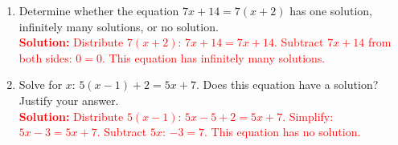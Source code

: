 \documentclass[11pt]{article}
\begin{document}
\begin{tcolorbox}[colframe=black!60, colback=white, 
coltitle=black, colbacktitle=black!15, fonttitle=\bfseries\Large, 
title=Exercises, halign title=center, left=10pt, right=10pt, top=10pt, bottom=60pt]
\begin{enumerate}[itemsep=3em]
    \item Determine whether the equation \(7x + 14 = 7(x+2)\) has one solution, infinitely many solutions, or no solution.\\
    \textcolor{red}{\textbf{Solution:} Distribute \(7(x+2)\): \(7x + 14 = 7x + 14\). Subtract \(7x + 14\) from both sides: \(0 = 0\). This equation has infinitely many solutions.}

    \item Solve for \(x\): \(5(x - 1) + 2 = 5x + 7\). Does this equation have a solution? Justify your answer.\\
    \textcolor{red}{\textbf{Solution:} Distribute \(5(x-1)\): \(5x - 5 + 2 = 5x + 7\). Simplify: \(5x - 3 = 5x + 7\). Subtract \(5x\): \(-3 = 7\). This equation has no solution.}
\end{enumerate}
\end{tcolorbox}

\vspace{1em}
\end{document}
